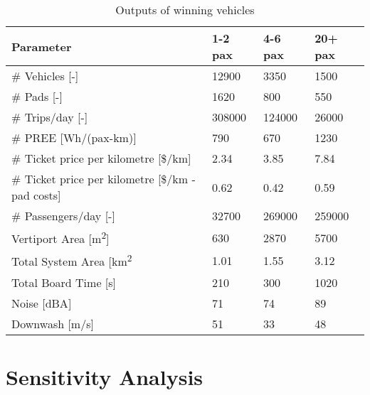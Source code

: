 \begin{table}[H]
\captionsetup{justification=centering}
\caption{Outputs of winning vehicles}
\label{outputswinES}
\begin{tabular}{llll}
\hline
\textbf{Parameter}                          & \textbf{1-2 pax} & \textbf{4-6 pax} & \textbf{20+ pax} \\ \hline
\# Vehicles {[}-{]}                         & 12900             &     3350             & 1500             \\
\# Pads {[}-{]}                             & 1620             &        800          & 550              \\
\# Trips/day {[}-{]}                        & 308000           &       124000           & 26000            \\
\# PREE {[}Wh/(pax-km){]}                   & 790           &        670          & 1230           \\
\# Ticket price per kilometre {[}\$/km{]} & 2.34             &    3.85              & 7.84             \\
\# Ticket price per kilometre {[}\$/km - pad costs{]} & 0.62             &    0.42              & 0.59             \\
\# Passengers/day {[}-{]}                   & 32700           &     269000             & 259000           \\
Vertiport Area {[}m\textsuperscript{2}{]}   & 630            &     2870             & 5700             \\
Total System Area {[}km\textsuperscript{2}  & 1.01          &       1.55           & 3.12          \\
Total Board Time {[}s{]}                    & 210              &        300          & 1020             \\
Noise {[}dBA{]}                             & 71             &       74           & 89             \\ 
Downwash [m/s]                              & 51            &       33              &   48      \\ \hline
\end{tabular}
\end{table}

\section{Sensitivity Analysis}










